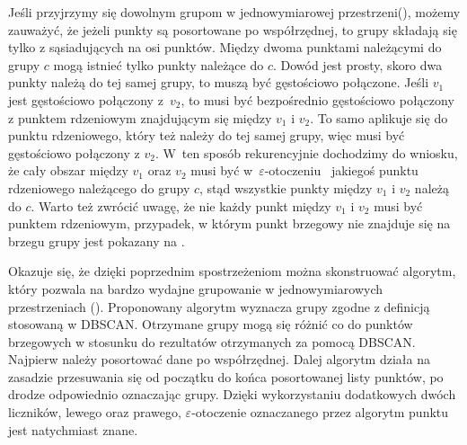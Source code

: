 

Jeśli przyjrzymy się dowolnym grupom w jednowymiarowej przestrzeni\linebreak (), możemy zauważyć, że jeżeli punkty są posortowane po współrzędnej, to grupy składają się tylko z sąsiadujących na osi punktów. Między dwoma punktami należącymi do grupy $ c $ mogą istnieć tylko punkty należące do $ c $. Dowód jest prosty, skoro dwa punkty należą do tej samej grupy, to muszą być gęstościowo połączone. Jeśli $ v_1 $ jest gęstościowo połączony \mbox{z $ v_2 $}, to musi być bezpośrednio gęstościowo połączony z punktem rdzeniowym znajdującym się między $ v_1 $ i $ v_2 $. To samo aplikuje się do punktu rdzeniowego, który też należy do tej samej grupy, więc musi być gęstościowo połączony z $ v_2 $. \mbox{W ten} sposób rekurencyjnie dochodzimy do wniosku, że cały obszar między $ v_1 $ oraz $ v_2 $ musi być \mbox{w $ \varepsilon $-otoczeniu } jakiegoś punktu rdzeniowego należącego do grupy $ c $, stąd wszystkie punkty między $ v_1 $ i $ v_2 $ należą do $ c $. Warto też zwrócić uwagę, że nie każdy punkt między $ v_1 $ i $ v_2 $ musi być punktem rdzeniowym, przypadek, w którym punkt brzegowy nie znajduje się na brzegu grupy jest pokazany na .\par
Okazuje się, że dzięki poprzednim spostrzeżeniom można skonstruować algorytm, który pozwala na bardzo wydajne grupowanie w jednowymiarowych przestrzeniach (). Proponowany algorytm wyznacza grupy zgodne z definicją stosowaną w DBSCAN. Otrzymane grupy mogą się różnić co do punktów brzegowych w stosunku do rezultatów otrzymanych za pomocą DBSCAN. Najpierw należy posortować dane po współrzędnej. Dalej algorytm działa na zasadzie przesuwania się od początku do końca posortowanej listy punktów, po drodze odpowiednio oznaczając grupy. Dzięki wykorzystaniu dodatkowych dwóch liczników, lewego oraz prawego, $ \varepsilon $-otoczenie oznaczanego przez algorytm punktu jest natychmiast znane.\par



